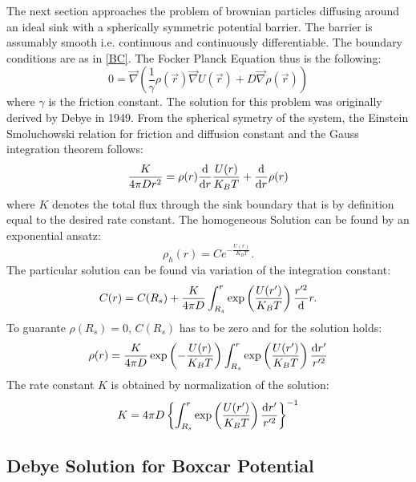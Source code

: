 The next section approaches the problem of brownian particles diffusing around an ideal sink with a spherically symmetric potential barrier. The barrier is assumably smooth i.e. continuous and continuously differentiable. The boundary conditions are as in \eqref{BC}. The Focker Planck Equation thus is the following:
\begin{equation}
    0=\vec{\nabla}\left( \frac{1}{\gamma} \rho(\vec{r}) \vec{\nabla} U(\vec{r}) + D \vec{\nabla} \rho(\vec{r}) \right)
\end{equation}
where $\gamma$ is the friction constant. The solution for this problem was originally derived by Debye in 1949.
From the spherical symetry of the system, the Einstein Smoluchowski relation for friction and diffusion constant and the Gauss integration theorem follows:
\begin{equation}
    \frac{K}{4 \pi D r^{2}} = \rho(r)\frac{{\rm d}}{{\rm d}r} \frac{U(r)}{K_B T} + \frac{{\rm d}}{{\rm d}r}\rho(r) 
\end{equation}
where $K$ denotes the total flux through the sink boundary that is by definition equal to the desired rate constant.
The homogeneous Solution can be found by an exponential ansatz:
\begin{equation}
    \rho_h(r) = C e^{-\frac{U(r)}{K_B T}}.
\end{equation}
The particular solution can be found via variation of the integration constant:
\begin{equation}
    C(r) = C(R_s) + \frac{K}{4 \pi D} \int_{R_s}^{r} \exp \left( \frac{U(r')}{K_B T} \right)\frac{r'^{2}} {{\rm d}}r.
\end{equation}
To guarante $\rho(R_s) = 0$, $C(R_s)$ has to be zero and for the solution holds:
\begin{equation}
    \rho(r) = \frac{K}{4 \pi D}\exp\left( -\frac{U(r)}{K_B T} \right) \int_{R_s}^{r} \exp\left( \frac{U(r')}{K_B T} \right)\frac{  {\rm d} r' }{r'^{2}}
    \label{Debye Solution}
\end{equation}
The rate constant $K$ is obtained by normalization of the solution:
\begin{equation}
    K = 4 \pi D \left\{  \int_{R_s}^{r} \exp\left( \frac{U(r')}{K_B T} \right)\frac{  {\rm d} r' }{r'^{2}} \right\}^{-1}
\end{equation}

\subsection{Debye Solution for Boxcar Potential}

